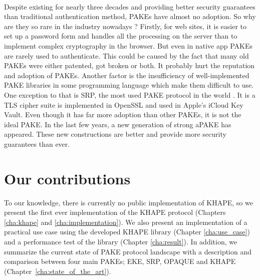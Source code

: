﻿\documentclass[../report.tex]{subfiles}
\begin{document}
\paragraph{}

Despite existing for nearly three decades and providing better security guarantees than traditional authentication method, PAKEs have almost no adoption. So why are they so rare in the industry nowadays ?
Firstly, for web sites, it is easier to set up a password form and handles all the processing on the server than to implement complex cryptography in the browser. But even in native app PAKEs are rarely used to authenticate.
This could be caused by the fact that many old PAKEs were either patented, got broken or both. %
It probably hurt the reputation and adoption of PAKEs.
Another factor is the insufficiency of well-implemented PAKE libraries in some programming language %
which make them difficult to use.
One exception to that is SRP, the most used PAKE protocol in the world \cite{PAKE_Green_blog}.
It is a TLS cipher suite is implemented in OpenSSL and used in Apple's iCloud Key Vault. Even though it has far more adoption than other PAKEs, it is not the ideal PAKE.
In the last few years, a new generation of strong aPAKE \cite{OPAQUE_Paper, KHAPE_Paper} has appeared. These new constructions are better and provide more security guarantees than ever.



\section{Our contributions}
To our knowledge, there is currently no public implementation of KHAPE, so we present the first ever implementation of the KHAPE protocol (Chapters \ref{cha:khape} and \ref{cha:implementation}).
We also present an implementation of a practical use case using the developed KHAPE library (Chapter \ref{cha:use_case}) and a performance test of the library (Chapter \ref{cha:result}).
In addition, we summarize the current state of PAKE protocol landscape with a description and comparison between four main PAKEs; EKE, SRP, OPAQUE and KHAPE (Chapter~\ref{cha:state_of_the_art}).
\end{document}
